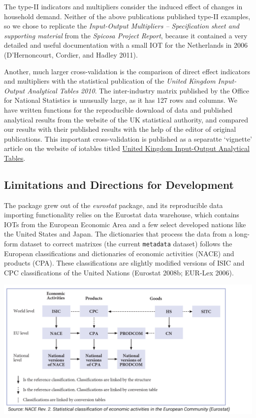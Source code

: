 \documentclass[
]{article}
\begin{document}
The type-II indicators and multipliers consider the induced effect of
changes in household demand. Neither of the above publications published
type-II examples, so we chose to replicate the \emph{Input-Output
Multipliers -- Specification sheet and supporting material} from the
\emph{Spicosa Project Report}, because it contained a very detailed and
useful documentation with a small IOT for the Netherlands in 2006
(D'Hernoncourt, Cordier, and Hadley 2011).

Another, much larger cross-validation is the comparison of direct effect
indicators and multipliers with the statistical publication of the
\emph{United Kingdom Input-Output Analytical Tables 2010}. The
inter-industry matrix published by the Office for National Statistics is
unusually large, as it has 127 rows and columns. We have written
functions for the reproducible download of data and published analytical
results from the website of the UK statistical authority, and compared
our results with their published results with the help of the editor of
original publications. This important cross-validation is published as a
separatte `vignette' article on the website of iotables titled
\href{https://iotables.dataobservatory.eu/articles/united_kingdom_2010.html}{United
Kingdom Input-Output Analytical Tables}.

\hypertarget{limitations-and-directions-for-development}{%
\subsection{Limitations and Directions for
Development}\label{limitations-and-directions-for-development}}

The package grew out of the \emph{eurostat} package, and its
reproducible data importing functionality relies on the Eurostat data
warehouse, which contains IOTs from the European Economic Area and a few
select developed nations like the United States and Japan. The
dictionaries that process the data from a long-form dataset to correct
matrixes (the current \texttt{metadata} dataset) follows the European
classifications and dictionaries of economic activities (NACE) and
products (CPA). These classifications are slightly modified versions of
ISIC and CPC classifications of the United Nations (Eurostat 2008b;
EUR-Lex 2006).

\includegraphics[width=32in]{plots/KS-RA-07-015-EN.PDF-15_p13_economic_classifications}
\end{document}
